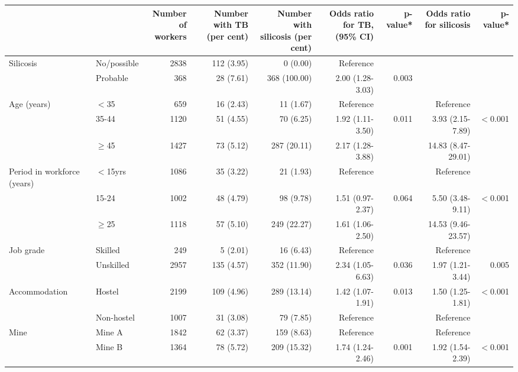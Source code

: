 \documentclass[11pt,a4paper,twoside]{article}\usepackage{graphicx, color}
\makeatletter
\newcommand\gobblepars{%
    \@ifnextchar\par%
        {\expandafter\gobblepars\@gobble}%
        {}}
\makeatother
\begin{document}
\gobblepars
\pagebreak[4]
\begin{sidewaystable}[p]
\begin{center}
{\small
\begin{tabular}{llrrrrrrr}
  \toprule
&   &\shortstack{Number of \\workers} & \shortstack{Number with TB \\(per cent)} & \shortstack{Number with \\silicosis (per cent)} & \shortstack{Odds ratio \\for TB, (95\% CI)} & p-value* & \shortstack{Odds ratio \\for silicosis} & p-value* \\ 
  \midrule
Silicosis & No/possible & 2838 & 112 (3.95) & 0 (0.00) & Reference &  &  &  \\ 
   & Probable & 368 & 28 (7.61) & 368 (100.00) & 2.00 (1.28-3.03) & 0.003 &  &  \\ 
  Age (years) & $<$35 & 659 & 16 (2.43) & 11 (1.67) & Reference &  & Reference &  \\ 
   & 35-44 & 1120 & 51 (4.55) & 70 (6.25) & 1.92 (1.11-3.50) & 0.011 & 3.93 (2.15-7.89) & $<$0.001 \\ 
   & $\geq$45 & 1427 & 73 (5.12) & 287 (20.11) & 2.17 (1.28-3.88) &  & 14.83 (8.47-29.01) &  \\ 
  Period in workforce (years) & $<$15yrs & 1086 & 35 (3.22) & 21 (1.93) & Reference &  & Reference &  \\ 
   & 15-24 & 1002 & 48 (4.79) & 98 (9.78) & 1.51 (0.97-2.37) & 0.064 & 5.50 (3.48-9.11) & $<$0.001 \\ 
   & $\geq$25 & 1118 & 57 (5.10) & 249 (22.27) & 1.61 (1.06-2.50) &  & 14.53 (9.46-23.57) &  \\ 
  Job grade & Skilled & 249 & 5 (2.01) & 16 (6.43) & Reference &  & Reference &  \\ 
   & Unskilled & 2957 & 135 (4.57) & 352 (11.90) & 2.34 (1.05-6.63) & 0.036 & 1.97 (1.21-3.44) & 0.005 \\ 
  Accommodation & Hostel & 2199 & 109 (4.96) & 289 (13.14) & 1.42 (1.07-1.91) & 0.013 & 1.50 (1.25-1.81) & $<$0.001 \\ 
   & Non-hostel & 1007 & 31 (3.08) & 79 (7.85) & Reference &  & Reference &  \\ 
  Mine & Mine A & 1842 & 62 (3.37) & 159 (8.63) & Reference &  & Reference &  \\ 
   & Mine B & 1364 & 78 (5.72) & 209 (15.32) & 1.74 (1.24-2.46) & 0.001 & 1.92 (1.54-2.39) & $<$0.001 \\ 

\end{tabular}}
\end{center}
\end{sidewaystable}
\end{document}
